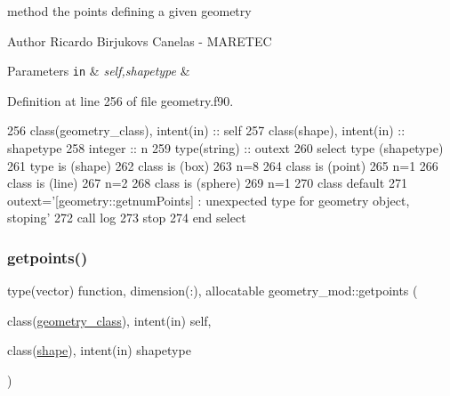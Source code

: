 method the points defining a given geometry 

\begin{DoxyAuthor}{Author}
Ricardo Birjukovs Canelas -\/ M\+A\+R\+E\+T\+EC 
\end{DoxyAuthor}

\begin{DoxyParams}[1]{Parameters}
\mbox{\tt in}  & {\em self,shapetype} & \\
\hline
\end{DoxyParams}


Definition at line 256 of file geometry.\+f90.


\begin{DoxyCode}
256     \textcolor{keywordtype}{class}(geometry\_class), \textcolor{keywordtype}{intent(in)} :: self
257     \textcolor{keywordtype}{class}(shape), \textcolor{keywordtype}{intent(in)} :: shapetype
258     \textcolor{keywordtype}{integer} :: n
259     \textcolor{keywordtype}{type}(string) :: outext
260     \textcolor{keywordflow}{select type} (shapetype)
261 \textcolor{keywordflow}{    type is} (shape)
262 \textcolor{keywordflow}{    class is} (box)
263         n=8
264 \textcolor{keywordflow}{    class is} (point)
265         n=1
266 \textcolor{keywordflow}{    class is} (line)
267         n=2
268 \textcolor{keywordflow}{    class is} (sphere)
269         n=1
270 \textcolor{keywordflow}{        class default}
271         outext=\textcolor{stringliteral}{'[geometry::getnumPoints] : unexpected type for geometry object, stoping'}
272         \textcolor{keyword}{call }log%
273         stop
274 \textcolor{keywordflow}{    end select}
\end{DoxyCode}
\mbox{\label{namespacegeometry__mod_a0b1a3c5aa414292ace34d59487082e3a}} 
\subsubsection{\texorpdfstring{getpoints()}{getpoints()}}
{\footnotesize\ttfamily type(vector) function, dimension(\+:), allocatable geometry\+\_\+mod\+::getpoints (\begin{DoxyParamCaption}\item[{class(\mbox{\hyperlink{structgeometry__mod_1_1geometry__class}{geometry\+\_\+class}}), intent(in)}]{self,  }\item[{class(\mbox{\hyperlink{structgeometry__mod_1_1shape}{shape}}), intent(in)}]{shapetype }\end{DoxyParamCaption})\hspace{0.3cm}{\ttfamily [private]}}



